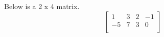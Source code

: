 \begin{example}
	Below is a 2 x 4 matrix.
	\begin{equation}
		\begin{bmatrix}
			1 & 3 & 2 & -1 \\
			-5 & 7 & 3 & 0 \\
		\end{bmatrix}
	\end{equation}
\end{example}